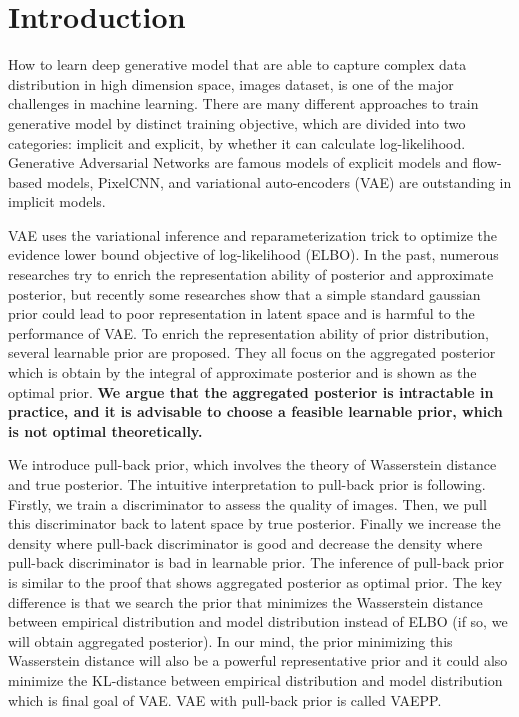 \section{Introduction}

How to learn deep generative model that are able to capture complex data distribution in high dimension space, \IE images dataset, is one of the major challenges in machine learning. There are many different approaches to train generative model by distinct training objective, which are divided into two categories: implicit and explicit, by whether it can calculate log-likelihood. Generative Adversarial Networks are famous models of explicit models and flow-based models, PixelCNN, and variational auto-encoders (VAE) are outstanding in implicit models. 

VAE uses the variational inference and reparameterization trick to optimize the evidence lower bound objective of log-likelihood (ELBO). In the past, numerous researches try to enrich the representation ability of posterior and approximate posterior, but recently some researches show that a simple standard gaussian prior could lead to poor representation in latent space and is harmful to the performance of VAE. To enrich the representation ability of prior distribution, several learnable prior are proposed. They all focus on the aggregated posterior which is obtain by the integral of approximate posterior and is shown as the optimal prior. \textbf{We argue that the aggregated posterior is intractable in practice, and it is advisable to choose a feasible learnable prior, which is not optimal theoretically. } 

We introduce pull-back prior, which involves the theory of Wasserstein distance and true posterior. The intuitive interpretation to pull-back prior is following. Firstly, we train a discriminator to assess the quality of images. Then, we pull this discriminator back to latent space by true posterior. Finally we increase the density where pull-back discriminator is good and decrease the density where pull-back discriminator is bad in learnable prior. The inference of pull-back prior is similar to the proof that shows aggregated posterior as optimal prior. The key difference is that we search the prior that minimizes the Wasserstein distance between empirical distribution and model distribution instead of ELBO (if so, we will obtain aggregated posterior). In our mind, the prior minimizing this Wasserstein distance will also be a powerful representative prior and it could also minimize the KL-distance between empirical distribution and model distribution which is final goal of VAE. VAE with pull-back prior is called VAEPP. 

